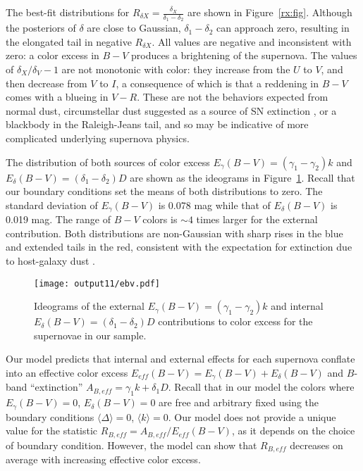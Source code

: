 \documentclass{aastex}   	%
\begin{document}
The best-fit distributions for $R_{\delta X}=\frac{\delta_X}{\delta_1-\delta_2}$ are shown in Figure~\ref{rx:fig}.
Although the posteriors of $\delta$ are close to Gaussian, $\delta_1-\delta_2$ can approach zero, resulting in the
elongated tail in negative  $R_{\delta X}$.
All values are negative and inconsistent with zero: a color excess in $B-V$ produces a brightening of the supernova.
The values of $\delta_X/\delta_V-1$ are not monotonic with color: they increase from the $U$ to $V$, and then decrease
from $V$ to $I$,
a consequence
of which is that
a reddening in $B-V$ comes with a blueing in $V-R$.
These are not the behaviors expected from normal dust,
circumstellar dust suggested as a source of SN extinction \citep{2005ApJ...635L..33W,2008ApJ...686L.103G,
2015ApJ...807L..26G}, or a blackbody in the Raleigh-Jeans tail, and so may be indicative of
more complicated underlying supernova physics.

The distribution of both sources of color excess $E_\gamma(B-V) =(\gamma_1-\gamma_2)k$ and
 $E_\delta(B-V) = (\delta_1-\delta_2)D$ are shown as the ideograms in Figure~\ref{ebv:fig}.
Recall that our boundary conditions set the means of both distributions to zero. 
The standard deviation of $E_\gamma(B-V)$ is 0.078 mag while that of $E_\delta(B-V)$ is 0.019 mag.
The range of $B-V$ colors is $\sim 4$ times larger for the external contribution. 
Both distributions are non-Gaussian with sharp rises in the blue and extended tails in the red, consistent
with the expectation for extinction due to host-galaxy dust \citep{1998ApJ...502..177H}.

\begin{figure}[htbp] %
   \centering
   \texttt{[image: output11/ebv.pdf]}
   \caption{Ideograms of the external $E_\gamma(B-V) =(\gamma_1-\gamma_2)k$ and
   internal $E_\delta(B-V) = (\delta_1-\delta_2)D$  contributions to color excess  for the supernovae in our sample.
   \label{ebv:fig}}
\end{figure}

Our model predicts that internal and external effects for each supernova  conflate into an effective color excess
$E_{eff}(B-V) = E_\gamma(B-V) + E_\delta(B-V)$ and $B$-band ``extinction''
$A_{B, eff} = \gamma_1 k + \delta_1D$.
Recall that in our model the colors where $E_\gamma(B-V)=0$,  $E_\delta(B-V)=0$ are free and arbitrary
fixed using the  boundary conditions $\langle \Delta \rangle = 0$, $\langle k \rangle = 0$.
Our model does not provide a unique value for the statistic $R_{B,eff} = A_{B, eff} /E_{eff}(B-V)$, as it depends on the choice of  boundary condition.
However, the model can show that  $R_{B,eff}$  decreases on average with increasing effective color excess.
\end{document}
